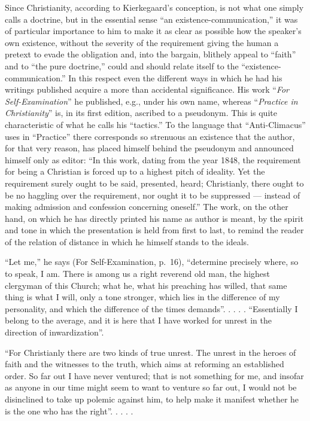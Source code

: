 \documentclass[12pt,a4paper]{article}
\newcommand{\opage}[1]{\marginnote{\footnotesize\textit{[#1]}}}
\begin{document}
Since Christianity, according to Kierkegaard's conception, is not what
one simply calls a doctrine, but in the essential sense ``an
existence-communication,'' it was of particular importance to him to
make it as clear as possible how the speaker's own existence, without
the severity of the requirement giving the human a pretext to
evade the obligation and, into the bargain, blithely appeal to
``faith'' and to ``the pure doctrine,'' could and should relate itself
to the ``existence-communication.'' In this respect even the different
ways in which he had his writings published acquire a more than
accidental significance. His work ``\emph{For Self-Examination}'' he
published, e.g., under his own name, whereas ``\emph{Practice in
Christianity}'' is, in its first edition, ascribed to a pseudonym.
This is quite characteristic of what he calls his ``tactics.'' To the
language that ``Anti-Climacus'' uses in
\opage{15}``Practice'' there corresponds so strenuous an existence that the
author, for that very reason, has placed himself behind the pseudonym
and announced himself only as editor: ``In this work, dating from the
year 1848, the requirement for being a Christian is forced up to a
highest pitch of ideality. Yet the requirement surely ought to be said,
presented, heard; Christianly, there ought to be no haggling over the
requirement, nor ought it to be suppressed --- instead of making
admission and confession concerning oneself.'' The work, on the other
hand, on which he has directly printed his name as author is meant, by
the spirit and tone in which the presentation is held from first to
last, to remind the reader of the relation of distance in which he
himself stands to the ideals.

``Let me,'' he says (For Self-Examination, p.~16), ``determine
precisely where, so to speak, I am. There is among us a right reverend
old man, the highest clergyman of this Church; what he, what his
preaching has willed, that same thing is what I will, only a tone
stronger, which lies in the difference of my personality, and which the
difference of the times demands''. . . . . ``Essentially I belong to
the average, and it is here that I have worked for unrest in the
direction of inwardization''.

``For Christianly there are two kinds of true unrest. The unrest in the
heroes of faith and the witnesses to the truth, which aims at reforming
an established order. So far out I have never ventured; that is not
something for me, and insofar as anyone in our time might seem to want
to venture so far out, I would not be disinclined to take up polemic
against him, to help make it manifest whether he is the one who has the
right''. . . . .
\end{document}
